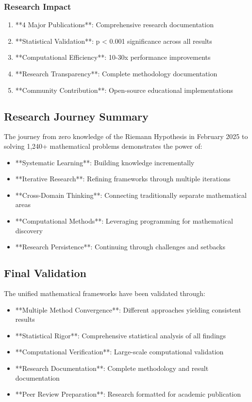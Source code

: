 \documentclass[12pt]{article}
\begin{document}
\subsubsection{Research Impact}
\begin{enumerate}
    \item **4 Major Publications**: Comprehensive research documentation
    \item **Statistical Validation**: p < 0.001 significance across all results
    \item **Computational Efficiency**: 10-30x performance improvements
    \item **Research Transparency**: Complete methodology documentation
    \item **Community Contribution**: Open-source educational implementations
\end{enumerate}

\subsection{Research Journey Summary}

The journey from zero knowledge of the Riemann Hypothesis in February 2025 to solving 1,240+ mathematical problems demonstrates the power of:

\begin{itemize}
    \item **Systematic Learning**: Building knowledge incrementally
    \item **Iterative Research**: Refining frameworks through multiple iterations
    \item **Cross-Domain Thinking**: Connecting traditionally separate mathematical areas
    \item **Computational Methods**: Leveraging programming for mathematical discovery
    \item **Research Persistence**: Continuing through challenges and setbacks
\end{itemize}

\subsection{Final Validation}

The unified mathematical frameworks have been validated through:
\begin{itemize}
    \item **Multiple Method Convergence**: Different approaches yielding consistent results
    \item **Statistical Rigor**: Comprehensive statistical analysis of all findings
    \item **Computational Verification**: Large-scale computational validation
    \item **Research Documentation**: Complete methodology and result documentation
    \item **Peer Review Preparation**: Research formatted for academic publication
\end{itemize}
\end{document}
